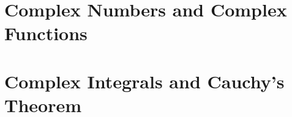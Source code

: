 \documentclass{report}
\begin{document}
	
	\thispagestyle{empty}
	\newpage%
	\tableofcontents
  

  \chapter{Complex Numbers and Complex Functions}
  
  \chapter{Complex Integrals and Cauchy's Theorem}
  
\end{document}
